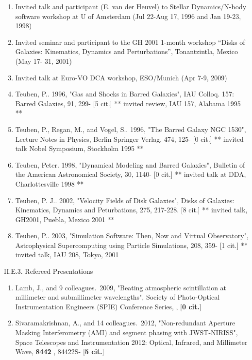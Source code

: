 \documentclass[11pt,letterpaper]{article}
\begin{document}
\begin{enumerate}[resume,label=\textbf{\arabic*}.]  
\item
Invited talk and participant (E. van der Heuvel) to Stellar
Dynamics/N-body software workshop at U of Amsterdam (Jul 22-Aug 17,
1996 and Jan 19-23, 1998)

\item
Invited seminar and participant to the GH 2001 1-month workshop
``Disks of Galaxies:  Kinematics, Dynamics and Perturbations'',
Tonantzintla, Mexico (May 17-			31, 2001)

\item
Invited talk at Euro-VO DCA workshop, ESO/Munich (Apr 7-9, 2009)  

\item
Teuben, P..  1996,  "Gas and Shocks in Barred Galaxies",
IAU Colloq. 157: Barred Galaxies,  91,  299- [5 cit.]
** invited review, IAU 157, Alabama 1995 **

\item
Teuben, P., Regan, M., and Vogel, S..  1996,
"The Barred Galaxy NGC 1530", Lecture Notes in Physics, Berlin Springer Verlag,  474,  125- [0 cit.]
** invited talk Nobel Symposium, Stockholm 1995 **

\item
Teuben, Peter.  1998,  "Dynamical Modeling and Barred Galaxies",
Bulletin of the American Astronomical Society,  30,  1140- [0 cit.]
** invited talk at DDA, Charlottesville 1998 **

\item
Teuben, P. J..  2002,
"Velocity Fields of Disk Galaxies", Disks of Galaxies: Kinematics, Dynamics and Peturbations,  275,  217-228.  [8 cit.]
** invited talk, GH2001, Puebla, Mexico 2001 **

\item
Teuben, P..  2003,
"Simulation Software: Then, Now and Virtual Observatory",
Astrophysical Supercomputing using Particle Simulations,  208,  359- [1 cit.]
** invited talk, IAU 208, Tokyo, 2001
\end{enumerate}

II.E.3. Refereed Presentations


\begin{enumerate}[resume,label=\textbf{\arabic*}.]

\item  
Lamb, J., and 9 colleagues.\  2009,  "Beating atmospheric scintillation at 
millimeter and submillimeter wavelengths", Society of Photo-Optical 
Instrumentation Engineers (SPIE) Conference Series,  ,  [{\bf 0 cit.}] 
  

\item  
Sivaramakrishnan, A., and 14 colleagues.\  2012,  "Non-redundant Aperture 
Masking Interferometry (AMI) and segment phasing with JWST-NIRISS", Space 
Telescopes and Instrumentation 2012: Optical, Infrared, and Millimeter 
Wave,  {\bf 8442} , 84422S- [{\bf 5 cit.}] 

\end{enumerate}
\end{document}
